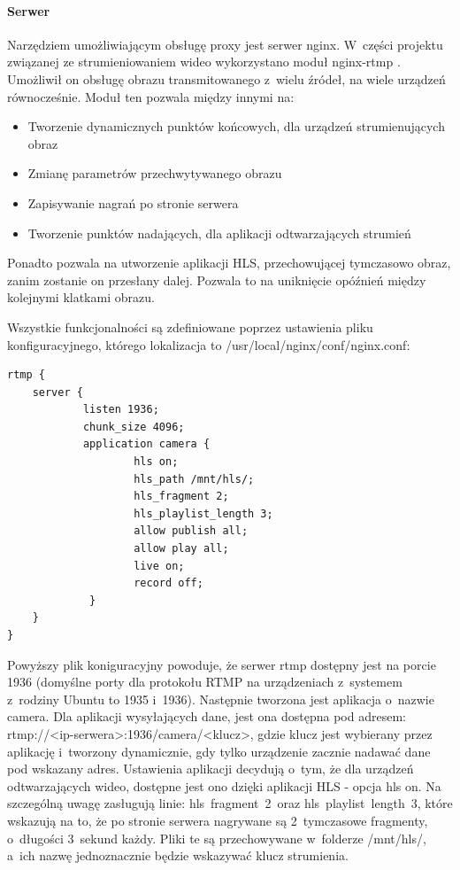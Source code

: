 \paragraph{Serwer}
Narzędziem umożliwiającym obsługę proxy jest serwer nginx. W~części projektu związanej ze strumieniowaniem wideo wykorzystano moduł nginx-rtmp \cite{NGINX}. Umożliwił on obsługę obrazu transmitowanego z~wielu źródeł, na wiele urządzeń równocześnie. 
Moduł ten pozwala między innymi na:
\begin{itemize}
\item Tworzenie dynamicznych punktów końcowych, dla urządzeń strumienujących obraz
\item Zmianę parametrów przechwytywanego obrazu 
\item Zapisywanie nagrań po stronie serwera
\item Tworzenie punktów nadających, dla aplikacji odtwarzających strumień
\end{itemize}
Ponadto pozwala na utworzenie aplikacji HLS, przechowującej tymczasowo obraz, zanim zostanie on przesłany dalej. Pozwala to na uniknięcie opóźnień między kolejnymi klatkami obrazu.

Wszystkie funkcjonalności są zdefiniowane poprzez ustawienia pliku konfiguracyjnego, którego lokalizacja to /usr/local/nginx/conf/nginx.conf:

\begin{verbatim}
rtmp {
    server {
            listen 1936;
            chunk_size 4096;
            application camera {
                    hls on;
                    hls_path /mnt/hls/;
                    hls_fragment 2;
                    hls_playlist_length 3;
                    allow publish all;
                    allow play all;
                    live on;
                    record off;
             }
    }
}
\end{verbatim}

Powyższy plik koniguracyjny powoduje, że serwer rtmp dostępny jest na porcie 1936 (domyślne porty dla protokołu RTMP na urządzeniach z~systemem z~rodziny Ubuntu to 1935 i~1936). Następnie tworzona jest aplikacja o~nazwie camera. Dla aplikacji wysyłających dane, jest ona dostępna pod adresem: rtmp://<ip-serwera>:1936/camera/<klucz>, gdzie klucz jest wybierany przez aplikację i~tworzony dynamicznie, gdy tylko urządzenie zacznie nadawać dane pod wskazany adres.
Ustawienia aplikacji decydują o~tym, że dla urządzeń odtwarzających wideo, dostępne jest ono dzięki aplikacji HLS - opcja hls on. Na szczególną uwagę zasługują linie: hls~fragment~2~oraz hls~playlist~length~3, które wskazują na to, że po stronie serwera nagrywane są 2~tymczasowe fragmenty, o~długości 3~sekund każdy. Pliki te są przechowywane w~folderze /mnt/hls/, a~ich nazwę jednoznacznie będzie wskazywać klucz strumienia.

